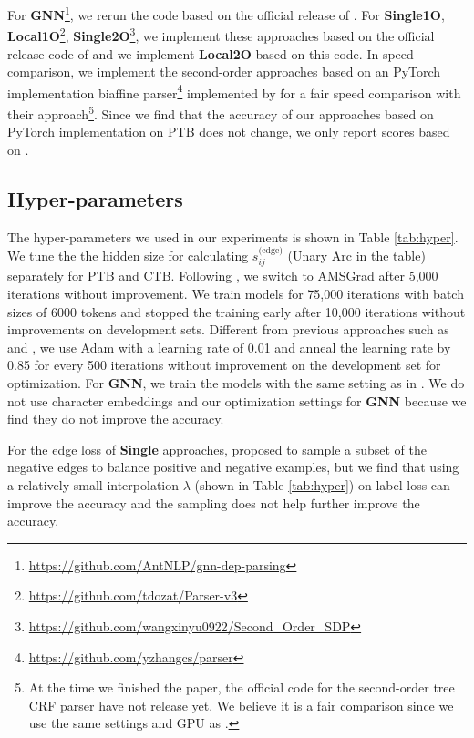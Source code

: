 \documentclass[11pt,a4paper]{article}
\begin{document}
For \textbf{GNN}\footnote{\url{https://github.com/AntNLP/gnn-dep-parsing}}, we rerun the code based on the official release of \citet{ji-etal-2019-graph}. For \textbf{Single1O}, \textbf{Local1O}\footnote{\url{https://github.com/tdozat/Parser-v3}}, \textbf{Single2O}\footnote{\url{https://github.com/wangxinyu0922/Second_Order_SDP}}, we implement these approaches based on the official release code of \citet{wang-etal-2019-second} and we implement \textbf{Local2O} based on this code. In speed comparison, we implement the second-order approaches based on an PyTorch implementation biaffine parser\footnote{\url{https://github.com/yzhangcs/parser}} implemented by \citet{zhang2020efficient} for a fair speed comparison with their approach\footnote{At the time we finished the paper, the official code for the second-order tree CRF parser have not release yet. We believe it is a fair comparison since we use the same settings and GPU as \citet{zhang2020efficient}.}. Since we find that the accuracy of our approaches based on PyTorch implementation on PTB does not change, we only report scores based on \citet{wang-etal-2019-second}.
\subsection{Hyper-parameters}


The hyper-parameters we used in our experiments is shown in Table \ref{tab:hyper}. We tune the the hidden size for calculating $s_{ij}^{\text{(edge)}}$ 
(Unary Arc in the table) separately for PTB and CTB. Following \citet{qi-etal-2018-universal}, we switch to AMSGrad \cite{j.2018on} after 5,000 iterations without improvement. We train models for 75,000 iterations with batch sizes of 6000 tokens and stopped the training early after 10,000 iterations without improvements on development sets. Different from previous approaches such as \citet{dozat2016deep} and \citet{ji-etal-2019-graph}, we use Adam \cite{kingma2014adam} with a learning rate of 0.01 and anneal the learning rate by 0.85 for every 500 iterations without improvement on the development set for optimization. For \textbf{GNN}, we train the models with the same setting as in \citet{ji-etal-2019-graph}. We do not use character embeddings and our optimization settings for \textbf{GNN} because we find they do not improve the accuracy. 

For the edge loss of \textbf{Single} approaches, \citet{zhang-etal-2019-empirical} proposed to sample a subset of the negative edges to balance positive and negative examples, but we find that using a relatively small interpolation $\lambda$ (shown in Table \ref{tab:hyper}) on label loss can improve the accuracy and the sampling does not help further improve the accuracy.
\end{document}
